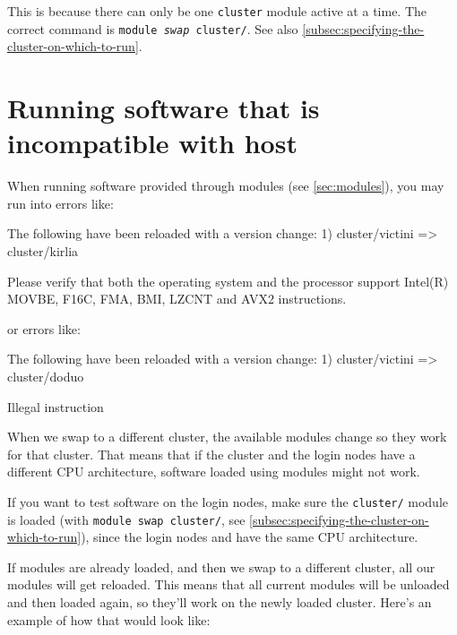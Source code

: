 This is because there can only be one \lstinline|cluster| module active at a time.
The correct command is \texttt{module \emph{swap} cluster/\othercluster}. See
also \autoref{subsec:specifying-the-cluster-on-which-to-run}.
\fi

\ifgent

\section{Running software that is incompatible with host}
\label{sec:running-software-incompatible-with-host}

When running software provided through modules (see \autoref{sec:modules}),
you may run into errors like:

\begin{prompt}

The following have been reloaded with a version change:
  1) cluster/victini => cluster/kirlia


Please verify that both the operating system and the processor support Intel(R) MOVBE, F16C, FMA, BMI, LZCNT and AVX2 instructions.

\end{prompt}

or errors like:

\begin{prompt}

The following have been reloaded with a version change:
  1) cluster/victini => cluster/doduo

Illegal instruction
\end{prompt}


When we swap to a different cluster, the available modules change so they work for that cluster.
That means that if the cluster and the login nodes have a different CPU architecture,
software loaded using modules might not work.

If you want to test software on the login nodes, make sure the \texttt{cluster/}
module is loaded (with \texttt{module swap cluster/}, see
\autoref{subsec:specifying-the-cluster-on-which-to-run}),
since the login nodes and  have the same CPU architecture.

If modules are already loaded, and then we swap to a different cluster,
all our modules will get reloaded. This means that all current modules will be
unloaded and then loaded again, so they'll work on the newly loaded cluster.
Here's an example of how that would look like:

